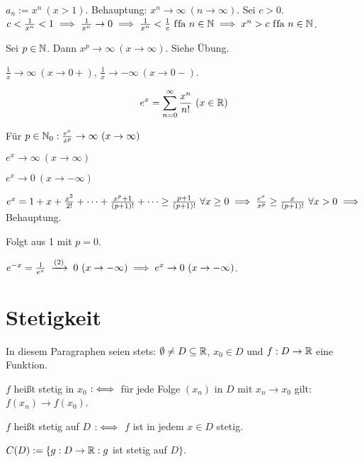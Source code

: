 \documentclass[a4paper,twoside,DIV15,BCOR12mm]{scrbook}
\begin{document}
\begin{beispiele}
\item $a_n := x^n\ (x > 1)$. Behauptung: $x^n\to \infty \ (n\to\infty)$. Sei $c>0$. $c<\frac{1}{x^n}<1 \implies \frac{1}{x^n} \to 0 \implies \frac{1}{x^n}<\frac{1}{c} \text{ f\/fa } n\in\mathbb{N} \implies x^n > c \text{ f\/fa } n\in\mathbb{N}$.
\item Sei $p\in\mathbb{N}$. Dann $x^p \to \infty \ (x\to\infty)$. Siehe Übung.
\item $\frac{1}{x} \to \infty \ (x \to 0+)$, $\frac{1}{x} \to -\infty \ (x\to 0-)$.
\end{beispiele}

\begin{satz}
$$e^x = \sum_{n=0}^{\infty} \frac{x^n}{n!} \ (x\in\mathbb{R})$$
\begin{liste}
\item Für $p\in\mathbb{N}_0: \frac{e^x}{x^p} \to \infty\ (x\to\infty)$
\item $e^x \to \infty \ (x\to\infty)$
\item $e^x \to 0 \ (x\to-\infty)$
\end{liste}
\end{satz}

\begin{beweis}
\begin{liste}
\item $e^x = 1 + x + \frac{x^2}{2!} + \cdots + \frac{x^p+1}{(p+1)!} + \cdots \ge \frac{p+1}{(p+1)!} \ \forall x \ge 0 \implies \frac{e^x}{x^p} \ge \frac{x}{(p+1)!} \ \forall x>0 \implies$ Behauptung.
\item Folgt aus 1 mit $p = 0$.
\item $e^{-x} = \frac{1}{e^x} \tonach{(2)} 0 \ (x \to -\infty) \folgt e^x \to 0 \ (x \to -\infty)$.
\end{liste}
\end{beweis}

\chapter{Stetigkeit}

\begin{vereinbarung}
In diesem Paragraphen seien stets: $\emptyset \neq D \subseteq \mathbb{R}$, $x_0 \in D$ und $f:D \to \mathbb{R}$ eine Funktion.
\end{vereinbarung}

\begin{definition}
\begin{liste}
\item $f$ heißt stetig in $x_0$ $:\iff$ für jede Folge $(x_n)$ in $D$ mit $x_n \to x_0$ gilt: $f(x_n) \to f(x_0)$.
\item $f$ heißt stetig auf $D$ $:\iff$ $f$ ist in jedem $x\in D$ stetig.
\item $C(D) := \{ g: D \to \mathbb{R}: g$ ist stetig auf $D\}$.
\end{liste}
\end{definition}
\end{document}
